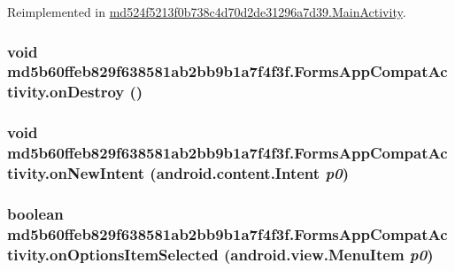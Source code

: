 Reimplemented in \hyperlink{classmd524f5213f0b738c4d70d2de31296a7d39_1_1_main_activity_94ab3f430f87543996addad12cb41fda}{md524f5213f0b738c4d70d2de31296a7d39.MainActivity}.\hypertarget{classmd5b60ffeb829f638581ab2bb9b1a7f4f3f_1_1_forms_app_compat_activity_e9b5956435d3ea855e30420a6bde26f8}{
\subsubsection[{onDestroy}]{\setlength{\rightskip}{0pt plus 5cm}void md5b60ffeb829f638581ab2bb9b1a7f4f3f.FormsAppCompatActivity.onDestroy ()}}
\label{classmd5b60ffeb829f638581ab2bb9b1a7f4f3f_1_1_forms_app_compat_activity_e9b5956435d3ea855e30420a6bde26f8}


\hypertarget{classmd5b60ffeb829f638581ab2bb9b1a7f4f3f_1_1_forms_app_compat_activity_3a5e7bf9d05c545fe127901e0908a237}{
\subsubsection[{onNewIntent}]{\setlength{\rightskip}{0pt plus 5cm}void md5b60ffeb829f638581ab2bb9b1a7f4f3f.FormsAppCompatActivity.onNewIntent (android.content.Intent {\em p0})}}
\label{classmd5b60ffeb829f638581ab2bb9b1a7f4f3f_1_1_forms_app_compat_activity_3a5e7bf9d05c545fe127901e0908a237}


\hypertarget{classmd5b60ffeb829f638581ab2bb9b1a7f4f3f_1_1_forms_app_compat_activity_d71679491ce674b6fcefc81dcc73fbcd}{
\subsubsection[{onOptionsItemSelected}]{\setlength{\rightskip}{0pt plus 5cm}boolean md5b60ffeb829f638581ab2bb9b1a7f4f3f.FormsAppCompatActivity.onOptionsItemSelected (android.view.MenuItem {\em p0})}}
\label{classmd5b60ffeb829f638581ab2bb9b1a7f4f3f_1_1_forms_app_compat_activity_d71679491ce674b6fcefc81dcc73fbcd}


